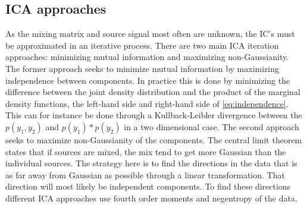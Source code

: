 \subsection{ICA approaches}
As the mixing matrix and source signal most often are unknown, the IC’s must be approximated in an iterative process. There are two main ICA iteration approaches: minimizing mutual information and maximizing non-Gaussianity. The former approach seeks to minimize mutual information by maximizing independence between components. In practice this is done by minimizing the difference between the joint density distribution and the product of the marginal density functions, the left-hand side and right-hand side of \eqref{eq:independence}. This can for instance be done through a Kullback-Leibler divergence between the $p(y_1,y_2)$ and $p(y_1)*p(y_2)$ in a two dimensional case.
The second approach seeks to maximize non-Gaussianity of the components. The central limit theorem states that if sources are mixed, the mix tend to get more Gaussian than the individual sources. The strategy here is to find the directions in the data that is as far away from Gaussian as possible through a linear transformation. That direction will most likely be independent components. To find these directions different ICA approaches use fourth order moments and negentropy of the data. \cite{Hyvarinen2001} 
%
%
%
